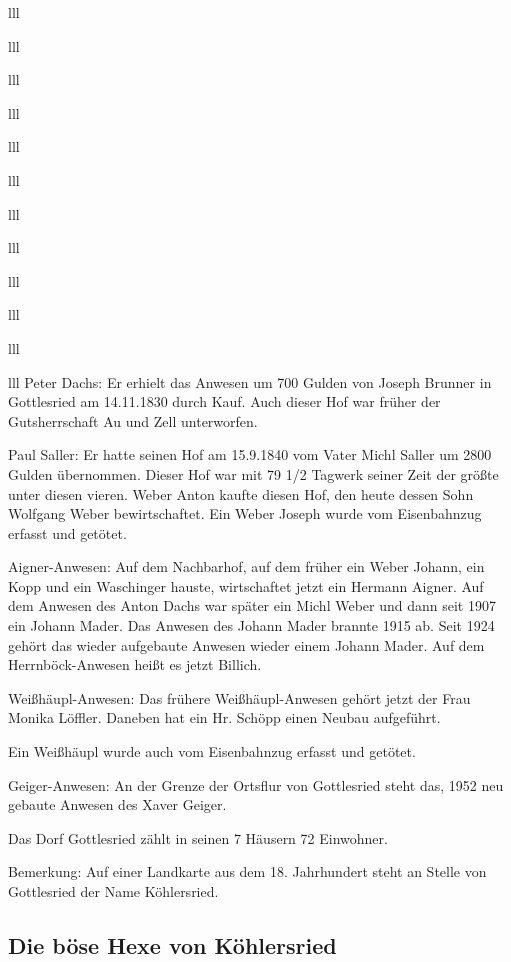 \documentclass[12pt,a4pager]{book}
\begin{document}
\begin{tabuluar}{lll}
\begin{tabuluar}{lll}
\begin{tabuluar}{lll}
\begin{tabuluar}{lll}
\begin{tabuluar}{lll}
\begin{tabuluar}{lll}
\begin{tabuluar}{lll}
\begin{tabuluar}{lll}
\begin{tabuluar}{lll}
\begin{tabuluar}{lll}
\begin{tabuluar}{lll}
\begin{tabuluar}{lll}
Peter Dachs: Er erhielt das Anwesen um 700 Gulden von Joseph Brunner in
Gottlesried am 14.11.1830 durch Kauf. Auch dieser Hof war früher der
Gutsherrschaft Au und Zell unterworfen.

Paul Saller: Er hatte seinen Hof am 15.9.1840 vom Vater Michl Saller um 2800
Gulden übernommen. Dieser Hof war mit 79 1/2 Tagwerk seiner Zeit der größte unter
diesen vieren. Weber Anton kaufte diesen Hof, den heute dessen Sohn Wolfgang
Weber bewirtschaftet. Ein Weber Joseph wurde vom Eisenbahnzug erfasst und
getötet.

Aigner-Anwesen: Auf dem Nachbarhof, auf dem früher ein Weber Johann, ein Kopp
und ein Waschinger hauste, wirtschaftet jetzt ein Hermann Aigner. Auf dem
Anwesen des Anton Dachs war später ein Michl Weber und dann seit 1907 ein Johann
Mader. Das Anwesen des Johann Mader brannte 1915 ab. Seit 1924 gehört das wieder
aufgebaute Anwesen wieder einem Johann Mader. Auf dem Herrnböck-Anwesen heißt es
jetzt Billich.

Weißhäupl-Anwesen: Das frühere Weißhäupl-Anwesen gehört jetzt der Frau Monika
Löffler. Daneben hat ein Hr. Schöpp einen Neubau aufgeführt.

Ein Weißhäupl wurde auch vom Eisenbahnzug erfasst und getötet.

Geiger-Anwesen: An der Grenze der Ortsflur von Gottlesried steht das, 1952 neu
gebaute Anwesen des Xaver Geiger.

Das Dorf Gottlesried zählt in seinen 7 Häusern 72 Einwohner.

Bemerkung: Auf einer Landkarte aus dem 18. Jahrhundert steht an Stelle von
Gottlesried der Name Köhlersried.

\subsection{Die böse Hexe von Köhlersried}


\end{tabuluar}
\end{tabuluar}
\end{tabuluar}
\end{tabuluar}
\end{tabuluar}
\end{tabuluar}
\end{tabuluar}
\end{tabuluar}
\end{tabuluar}
\end{tabuluar}
\end{tabuluar}
\end{tabuluar}
\end{document}
